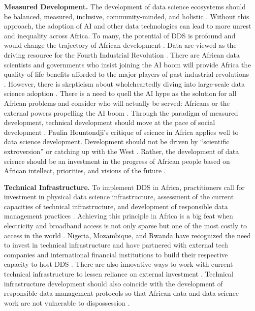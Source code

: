 \textbf{Measured Development.}
The development of data science ecosystems should be balanced, measured, inclusive, community-minded, and holistic \cite{kohnert2022machine, eke2023towards, ade-ibijola2023artificial}. Without this approach, the adoption of AI and other data technologies can lead to more unrest and inequality across Africa.
To many, the potential of DDS is profound and would change the trajectory of African development \cite{african_union2024continental, mabe2007security}. Data are viewed as the driving resource for the Fourth Industrial Revolution \cite{carman2023applying, gwagwa2019recommendations}. There are African data scientists and governments who insist joining the AI boom will provide Africa the quality of life benefits afforded to the major players of past industrial revolutions \cite{okolo2023responsible, kohnert2022machine, coetzee2004laterMarx}. 
However, there is skepticism about wholeheartedly diving into large-scale data science adoption \cite{uzomah2023african, olojede2023towards}. 
There is a need to quell the AI hype as the solution for all African problems and consider who will actually be served: Africans or the external powers propelling the AI boom \cite{wareham2021artificial,birhane2020algorithmic, sinha2023principlesafrofeminist}. 
Through the paradigm of measured development, technical development should move at the pace of social development \cite{kiemde2022towards, nyerere1962ujamaa}. Paulin Hountondji's critique of science in Africa applies well to data science development. Development should not be driven by ``scientific extroversion'' or catching up with the West \cite{hountondji2004producing,goffi2023teaching}. Rather, the development of data science should be an investment in the progress of African people based on African intellect, priorities, and visions of the future \cite{shilongo2023creativity,biko2004black}.

\textbf{Technical Infrastructure.}
\label{sec:tech_infra}
To implement DDS in Africa, practitioners call for investment in physical data science infrastructure, assessment of the current capacities of technical infrastructure, and development of responsible data management practices \cite{moahi2007globalization, ruttkampbloem2023epistemic}. Achieving this principle in Africa is a big feat when electricity and broadband access is not only sparse but one of the most costly to access in the world \cite{okolo2023responsible, ade-ibijola2023artificial}.  
Nigeria, Mozambique, and Rwanda have recognized the need to invest in technical infrastructure and have partnered with external tech companies and international financial institutions to build their respective capacity to host DDS \cite{okolo2023responsible}. 
There are also innovative ways to work with current technical infrastructure to lessen reliance on external investment \cite{mhlambi2020from}. 
Technical infrastructure development should also coincide with the development of responsible data management protocols so that African data and data science work are not vulnerable to dispossession \cite{abebe2021narratives, gwagwa2019recommendations}. 


